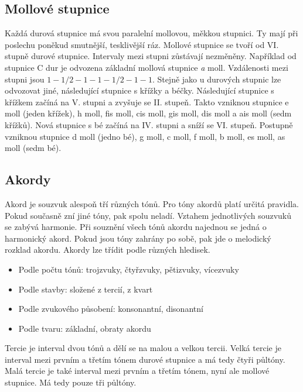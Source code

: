 \subsection{Mollové stupnice}
Každá durová stupnice má svou paralelní mollovou, měkkou stupnici.
Ty mají při poslechu poněkud smutnější, tesklivější ráz.
Mollové stupnice se tvoří od VI. stupně durové stupnice.
Intervaly mezi stupni zůstávají nezměněny.
Například od stupnice C dur je odvozena základní mollová stupnice \emph{a} moll.
Vzdálenosti mezi stupni jsou $1 - 1/2 - 1 - 1 - 1/2 - 1 - 1$.
Stejně jako u durových stupnic lze odvozovat jiné, 
následující stupnice s křížky a béčky.
Následující stupnice s křížkem začíná na V. stupni a zvyšuje se II. stupeň.
Takto vzniknou stupnice e moll (jeden křížek), h moll, fis moll, cis moll, gis moll, dis moll a ais moll (sedm křížků).
Nová stupnice s bé začíná na IV. stupni a sníží se VI. stupeň.
Postupně vzniknou stupnice d moll (jedno bé), g moll, c moll, f moll, b moll, es moll, as moll (sedm bé).
\cite{kofron}
\par

\subsection{Akordy}
Akord je souzvuk alespoň tří různých tónů.
Pro tóny akordů platí určitá pravidla.
Pokud současně zní jiné tóny, pak spolu neladí.
Vztahem jednotlivých souzvuků se zabývá harmonie.
Při souznění všech tónů akordu najednou se jedná o harmonický akord.
Pokud jsou tóny zahrány po sobě, pak jde o melodický rozklad akordu.
Akordy lze třídit podle různých hledisek.
\cite{zenkl}

\begin{itemize}
    \item Podle počtu tónů: trojzvuky, čtyřzvuky, pětizvuky, vícezvuky
    \item Podle stavby: složené z tercií, z kvart
    \item Podle zvukového působení: konsonantní, disonantní
    \item Podle tvaru: základní, obraty akordu
\end{itemize}

Tercie je interval dvou tónů a dělí se na malou a velkou tercii.
Velká tercie je interval mezi prvním a třetím tónem durové stupnice 
a má tedy čtyři půltóny.
Malá tercie je také interval mezi prvním a třetím tónem, nyní ale mollové stupnice.
Má tedy pouze tři půltóny.
\cite{zenkl}
\par

